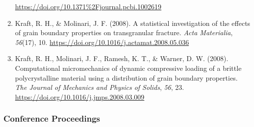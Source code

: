 \documentclass[11pt]{article}
\begin{document}
\begin{enumerate}
  \url{https://doi.org/10.1371\%2Fjournal.pcbi.1002619}
\item
  Kraft, R. 
H., \& Molinari, J. 
F. 
(2008). 
A statistical investigation
  of the effects of grain boundary properties on transgranular fracture.
  \emph{Acta Materialia}, \emph{56}(17), 10.
  \url{https://doi.org/10.1016/j.actamat.2008.05.036}
\item
  Kraft, R. 
H., Molinari, J. 
F., Ramesh, K. 
T., \& Warner, D. 
W. 
(2008).
  Computational micromechanics of dynamic compressive loading of a
  brittle polycrystalline material using a distribution of grain
  boundary properties. 
\emph{The Journal of Mechanics and Physics of
  Solids}, \emph{56}, 23.
  \url{https://doi.org/10.1016/j.jmps.2008.03.009}
\end{enumerate}

\subsubsection{Conference Proceedings}\label{conference-proceeding}
\end{document}
